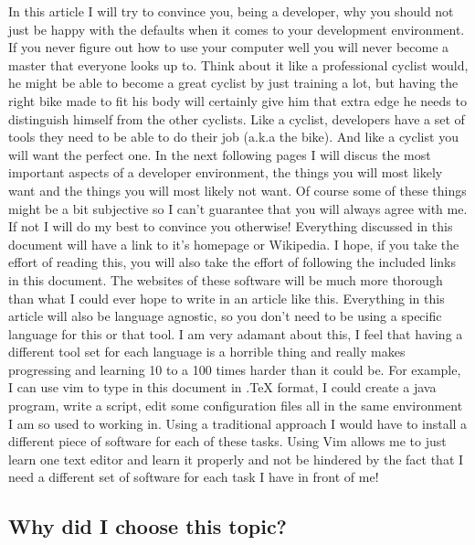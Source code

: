 \documentclass[paper=a4, fontsize=10pt]{scrartcl} %
\numberwithin{equation}{section} %
\numberwithin{figure}{section} %
\numberwithin{table}{section} %
\begin{document}
In this article I will try to convince you, being a developer, why you should not just
be happy with the defaults when it comes to your development environment. If
you never figure out how to use your computer well you will never become a master that everyone looks up to.
\newline
\newline
Think about it like a professional cyclist would, he might be able to become a
great cyclist by just training a lot, but having the right bike made to fit his
body will certainly give him that extra edge he needs to distinguish himself
from the other cyclists.
Like a cyclist, developers have a set of tools they need to be able to
do their job (a.k.a the bike). And like a cyclist you will want the perfect one.
In the next following pages I will discus the most important
aspects of a developer environment, the things you will most likely want and
the things you will most likely not want. Of course some of these things might
be a bit subjective so I can't guarantee that you will always agree with me. If
not I will do my best to convince you otherwise!
\newline
\newline
Everything discussed in this document will have a link to it's homepage or
Wikipedia. I hope, if you take the effort of reading this, you will also take
the effort of following the included links in this document. The websites of
these software  will be much more thorough than what I could ever
hope to write in an article like this. 
\newline
Everything in this article will also be language agnostic, so you don't need to
be using a specific language for this or that tool. I am very adamant about
this, I feel that having a different tool set for each language is a
horrible thing and really makes progressing and learning 10 to a 100 times
harder than it could be. For example, I can use vim to type in this document in
.TeX format, I could create a java program, write a script, edit some configuration
files all in the same environment I am so used to working in. Using a
traditional approach I would have to install a different piece of software for
each of these tasks. Using Vim allows me to just learn one text editor and learn it properly and not be hindered by the
fact that I need a different set of software for each task I have in front of
me! 

\subsection{Why did I choose this  topic?}
\end{document}
